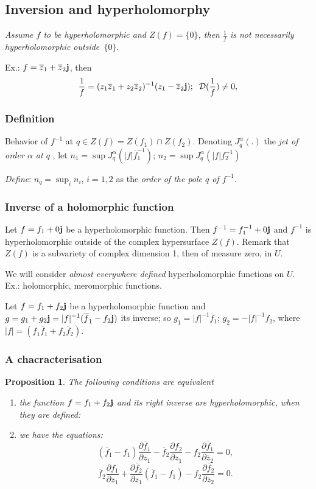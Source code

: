 \documentclass[12pt]{amsart}
\newtheorem{prop}[thm]{Proposition}
\theoremstyle{definition}
\begin{document}
\subsection {Inversion and hyperholomorphy} 

{\it Assume $f$ to be hyperholomorphic and $Z(f)=\{0\}$, then
$\displaystyle\frac{1}{f}$ is not necessarily hyperholomorphic outside~$\{0\}$}. 

Ex.: $f=\overline z_1+\overline z_2{\bf j}$, then
$$
\frac{1}{f}=(z_1\overline z_1+z_2\overline z_2)^{-1}(z_1-\overline z_2{\bf j}); \hskip 2mm{\mathcal D}(\frac{1}{f})\not =0, 
$$

\subsubsection{Definition} Behavior of $f^{-1}$ at $q\in Z(f)=Z(f_1)\cap Z(f_2)$. Denoting $J_q^\alpha(.)$ the {\it jet of order $\alpha$ at $q$} \cite{M 66}, let $\displaystyle n_1= \sup J_q^\alpha (\vert f\vert \overline f_1^{-1})$; $n_2=\sup J_q^\alpha (\vert f\vert f_2^{-1})$ 

{\it Define}: $\displaystyle n_q=\sup_i n_i$, $i=1,2$ as the {\it order of the pole $q$ of $f^{-1}$}.

\subsubsection {Inverse of a holomorphic function}

Let $f= f_1+0{\bf j}$ be a hyperholomorphic function. Then $f^{-1} =f_1^{-1}+0{\bf j}$ and $f^{-1}$ is hyperholomorphic outside of the complex hypersurface $Z(f)$. Remark that $Z(f)$ is a subvariety of complex dimension 1, then of measure zero, in $U$. 

We will consider {\it almost everywhere defined} hyperholomorphic functions on $U$. Ex.: holomorphic, meromorphic functions.

Let $f=f_1+f_2{\bf j}$ be a hyperholomorphic function and $g=g_1+g_2{\bf j}=\displaystyle \vert f\vert^{-1}(\overline f_1-f_2{\bf j})$ its inverse; so $g_1=\vert f\vert^{-1}\overline f_1$; $g_2=-\vert f\vert^{-1}f_2$, 
where $\vert f\vert=(f_1\overline f_1+f_2\overline f_2)$.
\subsubsection{A chacracterisation}

\begin{prop}\label{P31} The following conditions are equivalent
\begin{enumerate}
\item[$(i)$] the function $f=f_1+f_2{\bf j}$ and its right inverse are hyperholomorphic, when they are defined: 
\item[$(ii)$] we have the equations: 
$$
(\overline f_1- f_1)\frac{\partial\overline f_1}{\partial z_1}-\overline f_2\frac{\partial f_2}{\partial z_1}-f_2\frac{\partial\overline f_1}{\partial \overline z_2}=0, 
$$ 
$$
\overline f_2\frac{\partial f_1}{\partial z_1}+ \frac{\partial\overline f_2}{\partial z_1}(\overline f_1-f_1)-f_2\frac{\partial\overline f_2}{\partial\overline z_2}=0. 
$$
\end{enumerate}
\end{prop}
\end{document}
